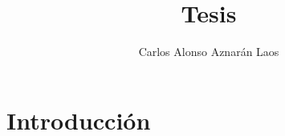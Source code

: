 \documentclass[12pt,a4paper,openany]{book}
\author{Carlos Alonso Aznarán Laos}
\title{Tesis}
\begin{document}
\maketitle
\tableofcontents

\chapter{Introducción}


\end{document}
